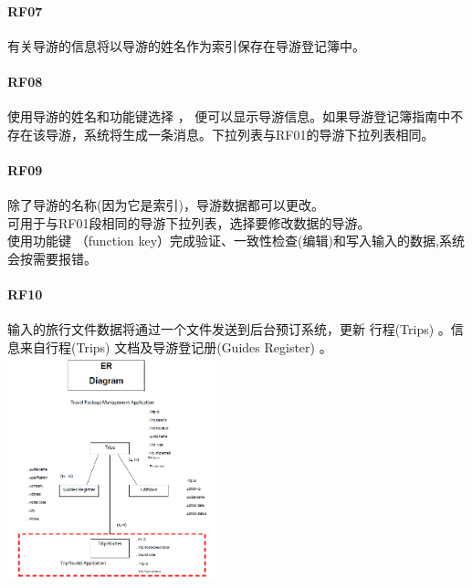 \hypertarget{rf07}{%
\paragraph{RF07}\label{rf07}}

有关导游的信息将以导游的姓名作为索引保存在导游登记簿中。\\

\hypertarget{rf08}{%
\paragraph{RF08}\label{rf08}}

使用导游的姓名和功能键选择 ，
便可以显示导游信息。如果导游登记簿指南中不存在该导游，系统将生成一条消息。下拉列表与RF01的导游下拉列表相同。\\

\hypertarget{rf09}{%
\paragraph{RF09}\label{rf09}}

除了导游的名称(因为它是索引)，导游数据都可以更改。\\
可用于与RF01段相同的导游下拉列表，选择要修改数据的导游。\\
使用功能键 （function
key）完成验证、一致性检查(编辑)和写入输入的数据,系统会按需要报错。\\

\hypertarget{rf10}{%
\paragraph{RF10}\label{rf10}}

输入的旅行文件数据将通过一个文件发送到后台预订系统，更新 行程(Trips)
。信息来自行程(Trips) 文档及导游登记册(Guides Register) 。\\


\includegraphics[width=6cm]{Sifp_3_1.png}

